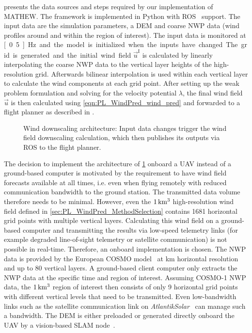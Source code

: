 \documentclass[twocolumn,letterpaper]{IEEEAerospaceCLS}
\begin{document}
 presents the data sources and steps required by our implementation of MATHEW. The framework is implemented in Python with \ac{ROS}~\cite{quigley2009ros} support. The input data are the simulation parameters, a \ac{DEM} and coarse \ac{NWP} data (wind profiles around and within the region of interest). The input data is monitored at \unit[0.5]{Hz} and the model is initialized when the inputs have changed. The grid is generated and the initial wind field $\vec{u}^\text{I}$ is calculated by linearly interpolating the coarse \ac{NWP} data to the vertical layer heights of the high-resolution grid. Afterwards bilinear interpolation is used within each vertical layer to calculate the wind components at each grid point. After setting up the weak problem formulation and solving for the velocity potential $\lambda$, the final wind field $\vec{u}$ is then calculated using \cref{eqn:PL_WindPred_wind_pred} and forwarded to a flight planner as described in \cite{Oettershagen2018RealTimePlanning}.

\begin{figure}[htb]
\centering

\caption[Architecture and interfaces]{Wind downscaling architecture: Input data changes trigger the wind field downscaling calculation, which then publishes its outputs via \ac{ROS} to the flight planner.}
\label{fig:PL_WindPred_Impl_Architecture}
\end{figure}

The decision to implement the architecture of \cref{fig:PL_WindPred_Impl_Architecture} onboard a \ac{UAV} instead of a ground-based computer is motivated by the requirement to have wind field forecasts available at all times, i.e. even when flying remotely with reduced communication bandwidth to the ground station. The transmitted data volume therefore needs to be minimal. However, even the $\unit[1]{km^3}$ high-resolution wind field defined in \cref{sec:PL_WindPred_MethodSelection} contains 1681 horizontal grid points with multiple vertical layers. Calculating this wind field on a ground-based computer and transmitting the results via low-speed telemetry links (for example degraded line-of-sight telemetry or satellite communication) is not possible in real-time. Therefore, an onboard implementation is chosen. The NWP data is provided by the European \ac{COSMO} model~\cite{COSMOMeteoSwiss} at \unit[1--7]{km} horizontal resolution and up to 80 vertical layers. A ground-based client computer only extracts the \ac{NWP} data at the specific time and region of interest. Assuming COSMO-1 \ac{NWP} data, the $\unit[1]{km^3}$ region of interest then consists of only 9 horizontal grid points with different vertical levels that need to be transmitted. Even low-bandwidth links such as the satellite communication link on \emph{AtlantikSolar}~\cite{Oettershagen_JFR2017} can manage such a bandwidth. The \ac{DEM} is either preloaded or generated directly onboard the \ac{UAV} by a vision-based \ac{SLAM} node~\cite{Hinzmann2016}.
\end{document}
